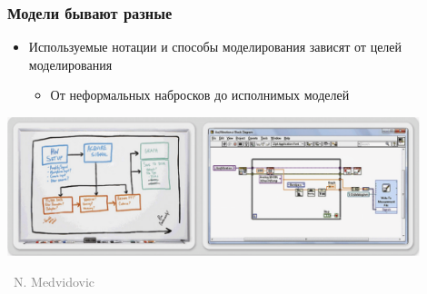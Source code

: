 \documentclass[xetex,mathserif,serif]{beamer}
\newcommand{\attribution}[1] {
    \vspace{-5mm}\begin{flushright}\begin{scriptsize}\textcolor{gray}{\textcopyright\, #1}\end{scriptsize}\end{flushright}
}
\begin{document}
    \begin{frame}
        \frametitle{Модели бывают разные}
        \begin{itemize}
            \item Используемые нотации и способы моделирования зависят от целей моделирования
            \begin{itemize}
                \item От неформальных набросков до исполнимых моделей
            \end{itemize}
        \end{itemize}
        \begin{center}
            \includegraphics[width=0.9\textwidth]{sketchesVsFormalNotations.png}
            \attribution{N. Medvidovic}
        \end{center}
    \end{frame}
\end{document}

